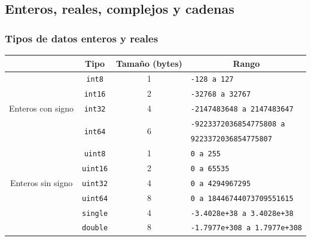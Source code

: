 \subsection{Enteros, reales, complejos y cadenas}
\begin{frame}[label=tipos_enteros]
 \frametitle{Tipos de datos enteros y reales}
 \begin{center}
  \begin{scriptsize}
   \begin{tabular}{|c|c|c|p{5cm}|}
   \multicolumn{1}{c}{ } & \multicolumn{1}{c}{\textbf{Tipo}} &
    \multicolumn{1}{c}{\textbf{Tamaño (bytes)}} &
    \multicolumn{1}{c}{\textbf{Rango}} \\ \toprule \hline
   \multirow{5}{*}{Enteros con signo} & \texttt{int8} & 1 & \texttt{-128 a 127}
    \\ \cline{2-4}
   & \texttt{int16} & 2 & \texttt{-32768 a 32767} \\ \cline{2-4}
   & \texttt{int32} & 4 & \texttt{-2147483648 a 2147483647} \\ \cline{2-4}
   & \multirow{2}{*}{\texttt{int64}} & \multirow{2}{*}{6} &
    \texttt{-9223372036854775808 a} \\ 
   & & & \texttt{9223372036854775807} \\ \hline
   \multirow{5}{*}{Enteros sin signo} & \texttt{uint8} & 1 & \texttt{0 a 255}
    \\ \cline{2-4}
   & \texttt{uint16} & 2 & \texttt{0 a 65535} \\ \cline{2-4}
   & \texttt{uint32} & 4 & \texttt{0 a 4294967295} \\ \cline{2-4}
   & \texttt{uint64} & 8 & \texttt{0 a 18446744073709551615} \\ \hline
   \multirow{2}{*}{Reales} & \texttt{single} & 4 & \texttt{-3.4028e+38 a
3.4028e+38} \\ \cline{2-4}
    & \texttt{double} & 8 & \texttt{-1.7977e+308 a 1.7977e+308} \\ \hline
  \end{tabular}
  \end{scriptsize}
 \end{center}
\end{frame}
